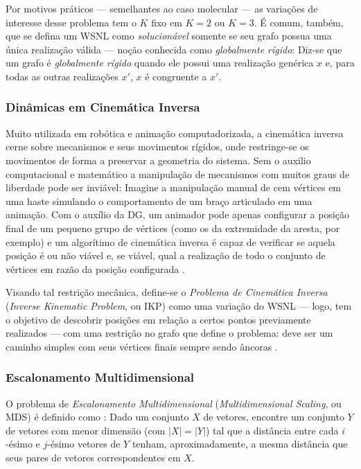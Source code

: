 \documentclass[a4paper,12pt]{article}
\begin{document}
Por motivos práticos --- semelhantes ao caso molecular --- as variações de interesse desse problema tem o $K$ fixo em $K= 2$ ou $K=3$. É comum, também, que se defina um WSNL como \textit{solucionável} somente se seu grafo possua uma única realização válida \cite{libertiEDG} --- noção conhecida como \textit{globalmente rígido}: Diz-se que um grafo é \textit{globalmente rígido} quando ele possui uma realização genérica $x$ e, para todas as outras realizações $x'$, $x$ é congruente a $x'$. 

\subsubsection{Dinâmicas em Cinemática Inversa}

Muito utilizada em robótica e animação computadorizada, a cinemática inversa cerne sobre mecanismos e seus movimentos rígidos, onde restringe-se os movimentos de forma a preservar a geometria do sistema. Sem o auxilio computacional e matemático a manipulação de mecanismos com muitos graus de liberdade  pode ser inviável: Imagine a manipulação manual de cem vértices em uma haste simulando o comportamento de um braço articulado em uma animação. Com o auxílio da DG, um animador pode apenas configurar a posição final de um pequeno grupo de vértices (como os da extremidade da aresta, por exemplo) e um algorítimo de cinemática inversa é capaz de verificar se aquela posição é ou não viável e, se viável, qual a realização de todo o conjunto de vértices em razão da posição configurada \cite{cinematicaInversa}.

Visando tal restrição mecânica, define-se o \textit{Problema de Cinemática Inversa} (\textit{Inverse Kinematic Problem}, ou IKP) como uma variação do WSNL --- logo, tem o objetivo de descobrir posições em relação a certos pontos previamente realizados --- com uma restrição no grafo que define o problema: deve ser um caminho simples com seus vértices finais sempre sendo âncoras \cite{carlileGDandAplications}.

\subsubsection{Escalonamento Multidimensional}

O problema de \textit{Escalonamento Multidimensional} (\textit{Multidimensional Scaling}, ou MDS)
é definido como \cite{carlileGDandAplications}: Dado um conjunto $X$ de vetores, encontre um conjunto $Y$ de vetores com menor dimensão (com $|X| = |Y|$) tal que a distância entre cada $i$-ésimo e $j$-ésimo vetores de $Y$ tenham, aproximadamente, a mesma distância que seus pares de vetores correspondentes em $X$.
\end{document}

